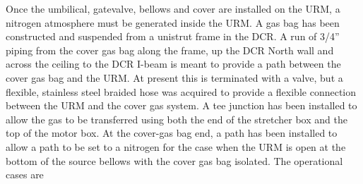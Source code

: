 \documentclass[11pt]{article}
\begin{document}
Once the umbilical, gatevalve, bellows and cover are installed on the
URM, a nitrogen atmosphere must be generated inside the URM. A 
gas bag has been constructed and suspended from a unistrut frame in
the DCR. A run of 3/4'' piping from the cover gas bag along the frame,
up the DCR North wall and across the ceiling to the DCR I-beam is meant
to provide a path between the cover gas bag and the URM. At present
this is terminated with a valve, but a flexible, stainless steel
braided hose was acquired to provide a flexible connection between the
URM and the cover gas system. A tee junction has been installed to
allow the gas to be transferred using both the end of the stretcher box
and the top of the motor box. At the cover-gas bag end, a path has been
installed to allow a path to be set to a nitrogen for the case when the
URM is open at the bottom of the source bellows with the cover gas bag
isolated. The operational cases are
\end{document}
